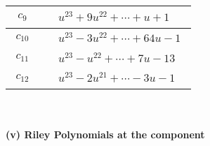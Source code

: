 \documentclass[1p]{elsarticle_modified}
\theoremstyle{definition}
\begin{document}
\begin{tabular}{m{50pt}|m{274pt}}
\hline $$\begin{aligned}c_{9}\end{aligned}$$&$\begin{aligned}
&u^{23}+9 u^{22}+\cdots+u+1
\end{aligned}$\\
\hline $$\begin{aligned}c_{10}\end{aligned}$$&$\begin{aligned}
&u^{23}-3 u^{22}+\cdots+64 u-1
\end{aligned}$\\
\hline $$\begin{aligned}c_{11}\end{aligned}$$&$\begin{aligned}
&u^{23}- u^{22}+\cdots+7 u-13
\end{aligned}$\\
\hline $$\begin{aligned}c_{12}\end{aligned}$$&$\begin{aligned}
&u^{23}-2 u^{21}+\cdots-3 u-1
\end{aligned}$\\
\hline
\end{tabular}\\~\\
\newpage\renewcommand{\arraystretch}{1}
\flushleft \textbf{(v) Riley Polynomials at the component}\newline \\
\end{document}
